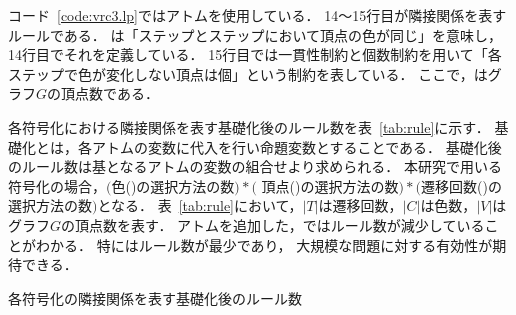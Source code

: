 コード~\ref{code:vrc3.lp}ではアトムを使用している．
14～15行目が隣接関係を表すルールである．
は「ステップとステップにおいて頂点の色が同じ」を意味し，
14行目でそれを定義している．
15行目では一貫性制約と個数制約を用いて「各ステップで色が変化しない頂点は個」という制約を表している．
ここで，はグラフ$G$の頂点数である．

各符号化における隣接関係を表す基礎化後のルール数を表~\ref{tab:rule}に示す．
基礎化とは，各アトムの変数に代入を行い命題変数とすることである．
基礎化後のルール数は基となるアトムの変数の組合せより求められる．
本研究で用いる符号化の場合，$($色()の選択方法の数$)*($
頂点()の選択方法の数$)*($遷移回数()の選択方法の数$)$となる．
表~\ref{tab:rule}において，$|T|$は遷移回数，$|C|$は色数，$|V|$はグラフ$G$の頂点数を表す．
アトムを追加した，ではルール数が減少していることがわかる．
特にはルール数が最少であり，
大規模な問題に対する有効性が期待できる．

\begin{table}[tb]
  \centering
  \caption{各符号化の隣接関係を表す基礎化後のルール数}
  
  \label{tab:rule}
\end{table}


